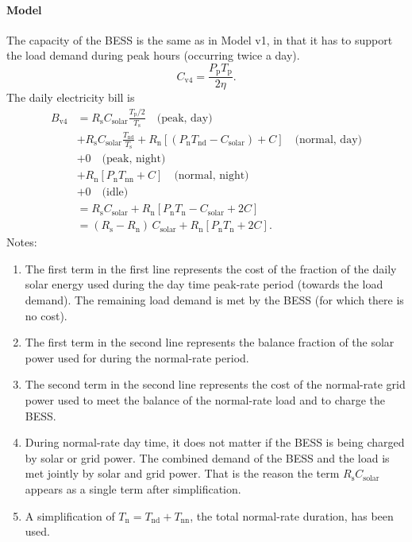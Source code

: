 \paragraph{Model} The capacity of the BESS is the same as in Model v1, in that it has to support
the load demand during peak hours (occurring twice a day). 
\begin{equation}
    C_{\text{v4}} = \frac{P_{\text{p}} T_{\text{p}} }{2 \eta}.
\end{equation}
The daily electricity bill is
\begin{align}
    B_{\text{v4}} & = 
       R_{\text{s}} C_{\text{solar}} \frac{T_{\text{p}}/2}{T_\text{s}} \quad \text{(peak, day)}  \\
    & + R_{\text{s}} C_{\text{solar}} \frac{T_{\text{nd}}}{T_\text{s}} 
    + R_{\text{n}} \left[ (P_{\text{n}} T_{\text{nd}} - C_{\text{solar}}) + C \right] 
     \quad \text{(normal, day)} \\
     & + 0 \quad \text{(peak, night)} \\
     & + R_{\text{n}} \left[ P_{\text{n}} T_{\text{nn}} + C \right] \quad \text{(normal, night)} \\
     & + 0 \quad \text{(idle)} \\
     & = R_{\text{s}} C_{\text{solar}} + R_{\text{n}} \left[ P_{\text{n}} T_{\text{n}} 
     - C_{\text{solar}} + 2 C \right] \\
     & = (R_{\text{s}}-R_{\text{n}}) \, C_{\text{solar}}  + R_{\text{n}} 
     \left[ P_{\text{n}} T_{\text{n}}  + 2 C \right].
\end{align}
Notes: 
\begin{enumerate}
\item The first term in the first line represents the cost of the fraction of
the daily solar energy used during the day time peak-rate period (towards the load demand).  The
remaining load demand is met by the BESS (for which there is no cost).

\item The first term in the second line represents the balance fraction of the solar power used
for during the normal-rate period.

\item The second term in the second line represents the cost of the normal-rate grid power 
used to meet the balance of the normal-rate load and to charge the BESS.

\item During normal-rate day time, it does not matter
if the BESS is being charged by solar or grid power. The combined demand of the
BESS and the load is met jointly by solar and grid power. That is the reason
the term $R_{\text{s}} C_{\text{solar}}$ appears as a single term after
simplification.  

\item A simplification of $T_{\text{n}} = T_{\text{nd}} + T_{\text{nn}}$, the total normal-rate duration, has been used.

\end{enumerate}

